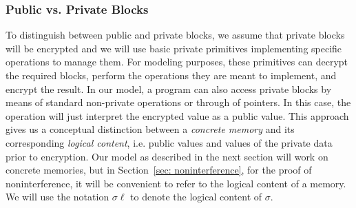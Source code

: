 \subsubsection{Public vs. Private Blocks}
To distinguish between public and private blocks, we assume that private blocks will be encrypted 
and we will use basic private primitives implementing specific operations to manage them. 
For modeling purposes, 
these primitives can decrypt the required blocks, perform 
the operations they are meant to implement, and encrypt the result. 
In our model, a program can also access private blocks by means of standard non-private operations or through of pointers. In this case, the operation will just interpret the encrypted value as a public value. This approach gives us a conceptual distinction between a \emph{concrete memory} and its corresponding \emph{logical content}, i.e. public values and values of the private data prior to encryption. Our model as described in the next section will work on concrete memories, but in Section~\ref{sec: noninterference}, for the proof of noninterference, it will be convenient to refer to the logical content of a memory. We will use the notation $\sigma\ell$ to denote the logical content of $\sigma$.  

